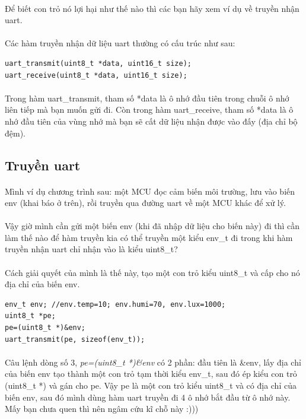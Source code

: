\documentclass[12pt,a5paper]{book}
\begin{document}
\paragraph{}
Để biết con trỏ nó lợi hại như thế nào thì các bạn hãy xem ví dụ về truyền nhận uart.
\paragraph{}
Các hàm truyền nhận dữ liệu uart thường có cấu trúc như sau:
\begin{lstlisting}
uart_transmit(uint8_t *data, uint16_t size);
uart_receive(uint8_t *data, uint16_t size);
\end{lstlisting}
\paragraph{}
Trong hàm uart\_transmit, tham số *data là ô nhớ đầu tiên trong chuỗi ô nhớ liên tiếp mà bạn muốn gửi đi. Còn trong hàm uart\_receive, tham số *data là ô nhớ đầu tiên của vùng nhớ mà bạn sẽ cất dữ liệu nhận được vào đấy (địa chỉ bộ đệm).
\subsection{Truyền uart}
\paragraph{}
Mình ví dụ chương trình sau: một MCU đọc cảm biến môi trường, lưu vào biến env (khai báo ở trên), rồi truyền qua đường uart về một MCU khác để xử lý.

\paragraph{}
Vậy giờ mình cần gửi một biến env (khi đã nhập dữ liệu cho biến này) đi thì cần làm thế nào để hàm truyền kia có thể truyền một kiểu env\_t đi trong khi hàm truyền nhận uart chỉ nhận vào là kiểu uint8\_t?
\paragraph{}
Cách giải quyết của mình là thế này, tạo một con trỏ kiểu uint8\_t và cấp cho nó địa chỉ của biến env.
\begin{lstlisting}
env_t env; //env.temp=10; env.humi=70, env.lux=1000;
uint8_t *pe;
pe=(uint8_t *)&env;
uart_transmit(pe, sizeof(env_t));
\end{lstlisting}
\paragraph{}
Câu lệnh dòng số 3, \textit{pe=(uint8\_t *)\&env} có 2 phần: đầu tiên là \&env, lấy địa chỉ của biến env tạo thành một con trỏ tạm thời kiểu env\_t, sau đó ép kiểu con trỏ (uint8\_t *) và gán cho pe. Vậy pe là một con trỏ kiểu uint8\_t và có địa chỉ của biến env, sau đó mình dùng hàm uart truyền đi 4 ô nhớ bắt đầu từ ô nhớ này. Mấy bạn chưa quen thì nên ngâm cứu kĩ chỗ này :)))
\end{document}
